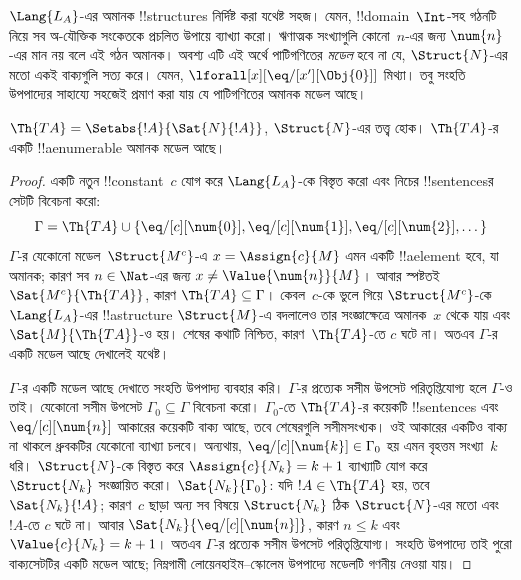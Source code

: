 \documentclass[../../../include/open-logic-section]{subfiles}
\begin{document}
\begin{explain}
$\Lang{L_A}$-এর অমানক !!{structure}s নির্দিষ্ট করা যথেষ্ট সহজ। যেমন,
!!{domain}~$\Int$-সহ গঠনটি নিয়ে সব অ-যৌক্তিক সংকেতকে প্রচলিত উপায়ে
ব্যাখ্যা করো। ঋণাত্মক সংখ্যাগুলি কোনো~$n$-এর জন্য $\num{n}$-এর মান নয়
বলে এই গঠন অমানক। অবশ্য এটি এই অর্থে পাটিগণিতের \emph{মডেল} হবে না যে,
$\Struct{N}$-এর মতো একই বাক্যগুলি সত্য করে। যেমন,
$\lforall[x][\eq/[x'][\Obj{0}]]$ মিথ্যা। তবু সংহতি উপপাদ্যের সাহায্যে
সহজেই প্রমাণ করা যায় যে পাটিগণিতের অমানক মডেল আছে।
\end{explain}

\begin{prop}
$\Th{TA}=\Setabs{!A}{\Sat{N}{!A}}$, $\Struct{N}$-এর তত্ত্ব হোক।
$\Th{TA}$-র একটি !!a{enumerable} অমানক মডেল আছে।
\end{prop}

\begin{proof}
একটি নতুন !!{constant}~$c$ যোগ করে $\Lang{L_A}$-কে বিস্তৃত করো এবং
নিচের !!{sentence}sর সেটটি বিবেচনা করো:
\[
\Gamma = \Th{TA} \cup \{\eq/[c][\num{0}], \eq/[c][\num{1}],
\eq/[c][\num{2}], \dots\}
\]
$\Gamma$-র যেকোনো মডেল~$\Struct{M^c}$-এ $x=\Assign{c}{M}$ এমন একটি
!!a{element} হবে, যা অমানক; কারণ সব $n \in \Nat$-এর জন্য
$x \neq \Value{\num{n}}{M}$। আবার স্পষ্টতই
$\Sat{M^c}{\Th{TA}}$, কারণ $\Th{TA} \subseteq \Gamma$। কেবল~$c$-কে
ভুলে গিয়ে $\Struct{M^c}$-কে $\Lang{L_A}$-এর !!a{structure}
$\Struct{M}$-এ বদলালেও তার সংজ্ঞাক্ষেত্রে অমানক~$x$ থেকে যায় এবং
$\Sat{M}{\Th{TA}}$-ও হয়। শেষের কথাটি নিশ্চিত, কারণ~$\Th{TA}$-তে
$c$ ঘটে না। অতএব $\Gamma$-র একটি মডেল আছে দেখালেই যথেষ্ট।

$\Gamma$-র একটি মডেল আছে দেখাতে সংহতি উপপাদ্য ব্যবহার করি।
$\Gamma$-র প্রত্যেক সসীম উপসেট পরিতৃপ্তিযোগ্য হলে $\Gamma$-ও তাই।
যেকোনো সসীম উপসেট $\Gamma_0 \subseteq \Gamma$ বিবেচনা করো।
$\Gamma_0$-তে $\Th{TA}$-র কয়েকটি !!{sentence}s এবং
$\eq/[c][\num{n}]$ আকারের কয়েকটি বাক্য আছে, তবে শেষেরগুলি সসীমসংখ্যক।
ওই আকারের একটিও বাক্য না থাকলে ধ্রুবকটির যেকোনো ব্যাখ্যা চলবে। অন্যথায়,
$\eq/[c][\num{k}] \in \Gamma_0$ হয় এমন বৃহত্তম সংখ্যা~$k$ ধরি।
$\Struct{N}$-কে বিস্তৃত করে $\Assign{c}{N_k}=k+1$ ব্যাখ্যাটি যোগ করে
$\Struct{N_k}$ সংজ্ঞায়িত করো। $\Sat{N_k}{\Gamma_0}$: যদি
$!A \in \Th{TA}$ হয়, তবে $\Sat{N_k}{!A}$; কারণ~$c$ ছাড়া অন্য সব
বিষয়ে $\Struct{N_k}$ ঠিক $\Struct{N}$-এর মতো এবং~$!A$-তে $c$ ঘটে না।
আবার $\Sat{N_k}{\eq/[c][\num{n}]}$, কারণ $n \le k$ এবং
$\Value{c}{N_k}=k+1$। অতএব $\Gamma$-র প্রত্যেক সসীম উপসেট
পরিতৃপ্তিযোগ্য। সংহতি উপপাদ্যে তাই পুরো বাক্যসেটটির একটি মডেল আছে;
নিম্নগামী লোয়েনহাইম--স্কোলেম উপপাদ্যে মডেলটি গণনীয় নেওয়া যায়।
\end{proof}
\end{document}
